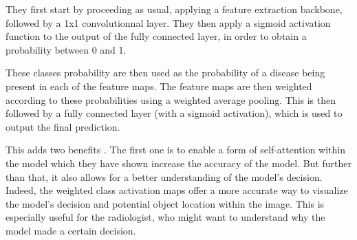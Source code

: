 \documentclass[11pt]{article}
\begin{document}
            They first start by proceeding as usual, applying a feature extraction backbone, followed by a 1x1 convolutionnal layer.
            They then apply a sigmoid activation function to the output of the fully connected layer, in order to obtain a probability between 0 and 1.

            These classes probability are then used as the probability of a disease being present in each of the feature maps. The feature maps are then
            weighted according to these probabilities using a weighted average pooling. This is then followed by a fully connected layer (with a sigmoid activation), which is used to output
            the final prediction.


            This adds two benefits . The first one is to enable a form of self-attention within the model which they have shown increase the accuracy of the model.
            But further than that, it also allows for a better understanding of the model's decision. Indeed, the weighted class activation maps offer a more accurate way to visualize the model's decision and potential object location
            within the image. This is especially useful for the radiologist, who might want to understand why the model made a certain decision.
\end{document}
